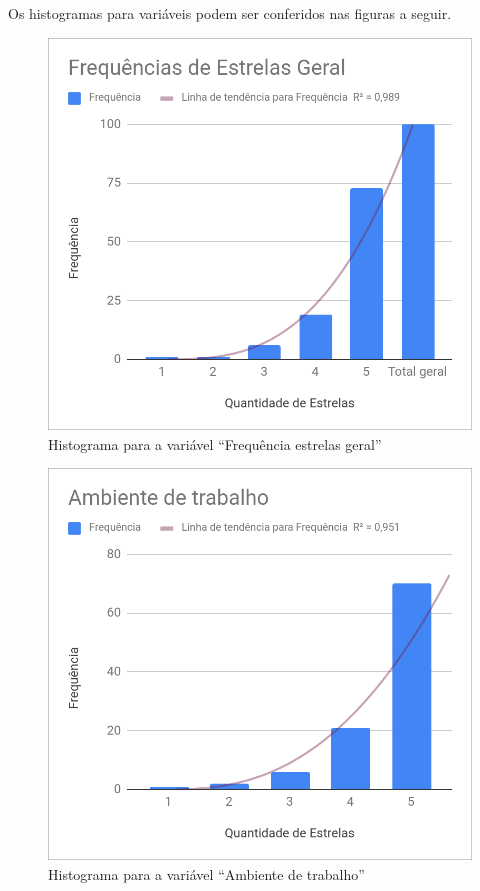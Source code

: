 	Os histogramas para variáveis podem ser conferidos nas figuras a seguir.
	
	\begin{figure}[H]
		\centering
		\caption{Histograma para a variável ``Frequência estrelas geral''}
		\label{fig:estrelas}
		\includegraphics[width=1\linewidth]{img/freq_estrelas_geral}
	\end{figure}

	\begin{figure}[H]
		\centering
		\caption{Histograma para a variável ``Ambiente de trabalho''}
		\label{fig:ambientetrabalho}
		\includegraphics[width=1\linewidth]{img/ambiente_trabalho}
	\end{figure}
	
